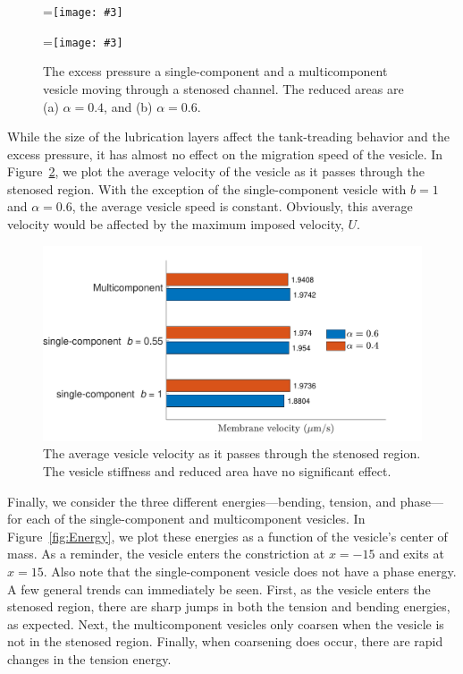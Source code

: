 \documentclass[twoside,twocolumn,9pt]{article}
\newcommand{\subfigimg}[3][,]{%
  \setbox1=\hbox{\texttt{[image: \#3]}}%
  \leavevmode\rlap{\usebox1}%
  \rlap{\hspace*{0pt}\raisebox{\dimexpr\ht1-0\baselineskip}{\bf
  \normalsize #2}}%
  \phantom{\usebox1}%
}
\begin{document}
\begin{figure}[H]
    \centering
    \subfigimg[width = 0.45\columnwidth]{(a)}{figures/Fig10a.pdf}
    \subfigimg[width = 0.45\columnwidth]{(b)}{figures/Fig10b.pdf}
    \caption{\small The excess pressure a single-component and a multicomponent vesicle moving through a stenosed channel. The reduced areas are (a) $\alpha = 0.4$, and (b) $\alpha = 0.6$.}
    \label{fig:excessPressure}
\end{figure}

While the size of the lubrication layers affect the tank-treading
behavior and the excess pressure, it has almost no effect on the
migration speed of the vesicle. In Figure~\ref{fig:vesVelocity}, we plot
the average velocity of the vesicle as it passes through the stenosed
region. With the exception of the single-component vesicle with $b=1$
and $\alpha = 0.6$, the average vesicle speed is constant. Obviously,
this average velocity would be affected by the maximum imposed velocity,
$U$.

\begin{figure}[H]
    \centering
    \includegraphics[width=\columnwidth]{figures/Fig9.pdf}
    \caption{\label{fig:vesVelocity} \small The average vesicle velocity as it passes through the stenosed region. The vesicle stiffness and reduced area have no significant effect.}
\end{figure}

Finally, we consider the three different energies---bending, tension,
and phase---for each of the single-component and multicomponent
vesicles. In Figure~\ref{fig:Energy}, we plot these energies as a
function of the vesicle's center of mass. As a reminder, the vesicle
enters the constriction at $x=-15$ and exits at $x=15$. Also note that
the single-component vesicle does not have a phase energy. A few general
trends can immediately be seen. First, as the vesicle enters the
stenosed region, there are sharp jumps in both the tension and bending
energies, as expected. Next, the multicomponent vesicles only coarsen
when the vesicle is not in the stenosed region. Finally, when coarsening
does occur, there are rapid changes in the tension energy.
\end{document}
